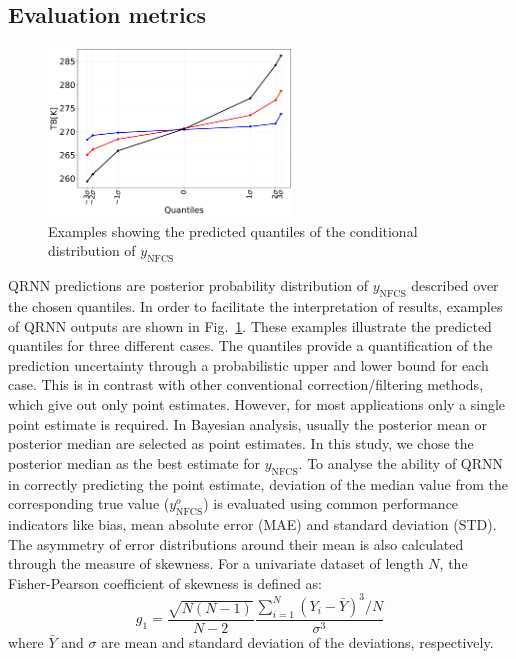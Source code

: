 \documentclass[amt, manuscript]{copernicus}
\newcommand{\ynfcs}{y_\text{NFCS}}
\newcommand{\yonfcs}{y^{o}_\text{NFCS}}
\begin{document}
\subsection{Evaluation metrics}
\label{sec:validation}
\begin{figure}[t]
	\centering
	\includegraphics[height=45mm]{Figures/fig01.pdf} 
	\caption{Examples showing the predicted quantiles of the conditional distribution of $\ynfcs$ }
	\label{fig:posterior_distribution_I1V}	
\end{figure}
QRNN predictions are posterior probability distribution of $\ynfcs$ described over the chosen quantiles. In order to facilitate the interpretation of results, examples of QRNN outputs are shown in Fig.~\ref{fig:posterior_distribution_I1V}. These examples illustrate the predicted quantiles for three different cases. The quantiles provide a quantification of the prediction uncertainty through a probabilistic upper and lower bound for each case. This is in contrast with other conventional correction/filtering methods, which give out only point estimates. However, for most applications only a single point estimate is required. In Bayesian analysis, usually the posterior mean or posterior median are selected as point estimates. In this study, we chose the posterior median as the best estimate for $\ynfcs$. To analyse the ability of QRNN in correctly predicting the point estimate, deviation of the median value from the corresponding true value ($\yonfcs$) is evaluated using common performance indicators like bias, mean absolute error (MAE) and standard deviation (STD). The asymmetry of error distributions around their mean is also calculated through the measure of skewness. For a univariate dataset of length $N$, the Fisher-Pearson coefficient of skewness is defined as: 
\begin{equation}
g_1 = 	\frac{\sqrt{N(N-1)}}{N-2} \frac{\sum_{i = 1}^{N}(Y_i - \bar{Y})^3/N}{\sigma^3}
\end{equation}
where $\bar{Y}$ and $\sigma$ are mean and standard deviation of the deviations, respectively.
\end{document}
